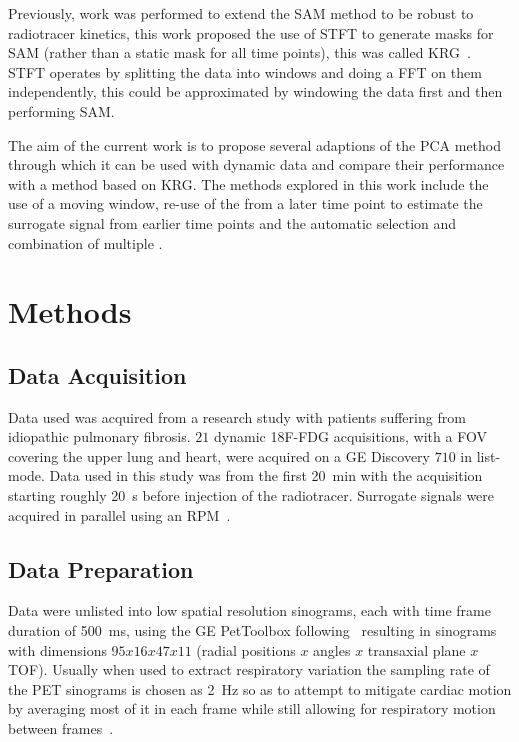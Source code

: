     
    Previously, work was performed to extend the \gls{SAM} method to be robust to radiotracer kinetics, this work proposed the use of \gls{STFT} to generate masks for \gls{SAM} (rather than a static mask for all time points), this was called \gls{KRG}~\cite{Schleyer2014}. \gls{STFT} operates by splitting the data into windows and doing a \gls{FFT} on them independently, this could be approximated by windowing the data first and then performing \gls{SAM}.
    
    The aim of the current work is to propose several adaptions of the \gls{PCA} method through which it can be used with dynamic data and compare their performance with a method based on \gls{KRG}. The methods explored in this work include the use of a moving window, re-use of the  from a later time point to estimate the surrogate signal from earlier time points and the automatic selection and combination of multiple .

    
\section{Methods} \label{sec:methods}
    \subsection{Data Acquisition} \label{sec:data_acquisition}
        Data used was acquired from a research study with patients suffering from idiopathic pulmonary fibrosis. $21$ dynamic \gls{18F-FDG} acquisitions, with a \gls{FOV} covering the upper lung and heart, were acquired on a \gls{GE} Discovery $710$ in list-mode. Data used in this study was from the first \SI{20}{\minute} with the acquisition starting roughly \SI{20}{\second} before injection of the radiotracer. Surrogate signals were acquired in parallel using an \gls{RPM}~\cite{Oh2019OptimalTreatment, Emond2020EffectReconstruction}.
    
        
    \subsection{Data Preparation} \label{sec:data_preparation}
        Data were unlisted into low spatial resolution sinograms, each with time frame duration of \SI{500}{\milli\second}, using the \gls{GE} PetToolbox following~\cite{Bertolli2017DataData} resulting in sinograms with dimensions $95 x 16 x 47 x 11$ (radial positions $x$ angles $x$ transaxial plane $x$ \gls{TOF}). Usually when used to extract respiratory variation the sampling rate of the \gls{PET} sinograms is chosen as \SI{2}{\hertz} so as to attempt to mitigate cardiac motion by averaging most of it in each frame while still allowing for respiratory motion between frames~\cite{Bertolli2018Data-DrivenTomography}.
        
